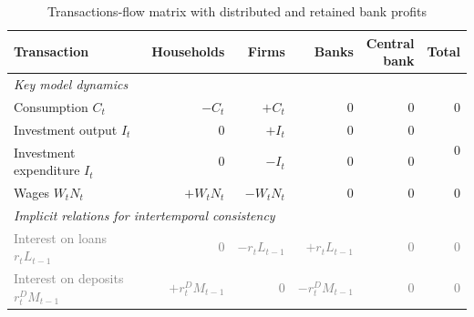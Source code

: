 \begin{table}[htbp]
  \centering
  \caption{Transactions-flow matrix with distributed and retained bank profits}
  \label{tab:sfc-simple-flows}
  \renewcommand{\arraystretch}{1.2}
  \begin{tabular}{lrrrrr}
    \toprule
    Transaction
      & Households
      & Firms
      & Banks
      & \makecell{Central\\bank}
      & Total
    \\
    \midrule


    \multicolumn{6}{l}{\textit{Key model dynamics}}
    \\
    \midrule

    Consumption $C_t$
      & $-C_t$
      & $+C_t$
      & $0$
      & $0$
      & $0$
    \\

    Investment output $I_t$
      & $0$
      & $+I_t$
      & $0$
      & $0$
      & \multirow{2}{*}{$0$}
    \\

    Investment expenditure $I_t$
      & $0$
      & $-I_t$
      & $0$
      & $0$
      & 
    \\

    Wages $W_tN_t$
      & $+W_tN_t$
      & $-W_tN_t$
      & $0$
      & $0$
      & $0$
    \\




    \midrule
    \multicolumn{6}{l}{\textit{Implicit relations for intertemporal consistency}}
    \\
    \midrule

    \textcolor{gray}{Interest on loans
      $r_tL_{t-1}$}
      & \textcolor{gray}{$0$}
      & \textcolor{gray}{$-r_tL_{t-1}$}
      & \textcolor{gray}{$+r_tL_{t-1}$}
      & \textcolor{gray}{$0$}
      & \textcolor{gray}{$0$}
    \\

    \textcolor{gray}{Interest on deposits
      $r^D_tM_{t-1}$}
      & \textcolor{gray}{$+r^D_tM_{t-1}$}
      & \textcolor{gray}{$0$}
      & \textcolor{gray}{$-r^D_tM_{t-1}$}
      & \textcolor{gray}{$0$}
      & \textcolor{gray}{$0$}
    \\


\end{tabular}
\end{table}
